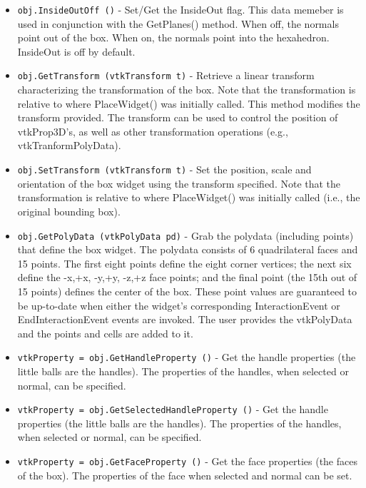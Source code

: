 \begin{itemize}
\item  \verb|obj.InsideOutOff ()| -  Set/Get the InsideOut flag. This data memeber is used in conjunction
 with the GetPlanes() method. When off, the normals point out of the
 box. When on, the normals point into the hexahedron.  InsideOut is off
 by default.

\item  \verb|obj.GetTransform (vtkTransform t)| -  Retrieve a linear transform characterizing the transformation of the
 box. Note that the transformation is relative to where PlaceWidget()
 was initially called. This method modifies the transform provided. The
 transform can be used to control the position of vtkProp3D's, as well as
 other transformation operations (e.g., vtkTranformPolyData).

\item  \verb|obj.SetTransform (vtkTransform t)| -  Set the position, scale and orientation of the box widget using the
 transform specified. Note that the transformation is relative to 
 where PlaceWidget() was initially called (i.e., the original bounding
 box). 

\item  \verb|obj.GetPolyData (vtkPolyData pd)| -  Grab the polydata (including points) that define the box widget. The
 polydata consists of 6 quadrilateral faces and 15 points. The first
 eight points define the eight corner vertices; the next six define the
 -x,+x, -y,+y, -z,+z face points; and the final point (the 15th out of 15
 points) defines the center of the box. These point values are guaranteed
 to be up-to-date when either the widget's corresponding InteractionEvent
 or EndInteractionEvent events are invoked. The user provides the
 vtkPolyData and the points and cells are added to it.

\item  \verb|vtkProperty = obj.GetHandleProperty ()| -  Get the handle properties (the little balls are the handles). The 
 properties of the handles, when selected or normal, can be 
 specified.

\item  \verb|vtkProperty = obj.GetSelectedHandleProperty ()| -  Get the handle properties (the little balls are the handles). The 
 properties of the handles, when selected or normal, can be 
 specified.

\item  \verb|vtkProperty = obj.GetFaceProperty ()| -  Get the face properties (the faces of the box). The 
 properties of the face when selected and normal can be 
 set.


\end{itemize}
